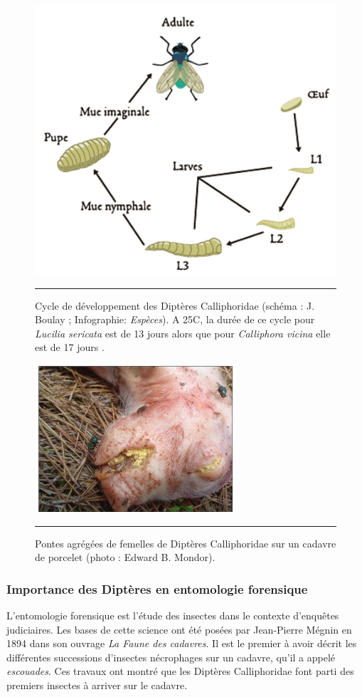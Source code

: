 \begin{figure}[ht]
\centering
		\includegraphics[width=0.6 \textwidth]{Figures/cycle_d_veloppement.png}
		\rule{35em}{0.5pt}
		\caption[Cycle]{Cycle de développement des Diptères Calliphoridae (schéma : J. Boulay ; Infographie: \textit{Espèces}). A 25C, la durée de ce cycle pour \textit{Lucilia sericata} est de 13 jours alors que pour \textit{Calliphora vicina} elle est de 17 jours \cite{marchenko_medico-legal_1988}.}
	\label{fig:cycle}
\end{figure}

\begin{figure}[ht]
\centering
		\includegraphics[width=0.8 \textwidth]{Figures/pontes.pdf}
		\rule{35em}{0.5pt}
		\caption[Pontes]{Pontes agrégées de femelles de Diptères Calliphoridae sur un cadavre de porcelet (photo : Edward B. Mondor).}
	\label{fig:pontes}
\end{figure}
 
        \subsubsection{Importance des Diptères en entomologie forensique}
        \label{subsubsec:forensique}
L'entomologie forensique est l'étude des insectes dans le contexte d'enquêtes judiciaires. Les bases de cette science ont été posées par Jean-Pierre Mégnin en 1894 dans son ouvrage \textit{La Faune des cadavres}. Il est le premier à avoir décrit les différentes successions d'insectes nécrophages sur un cadavre, qu'il a appelé \textit{escouades}. Ces travaux ont montré que les Diptères Calliphoridae font parti des premiers insectes à arriver sur le cadavre.

